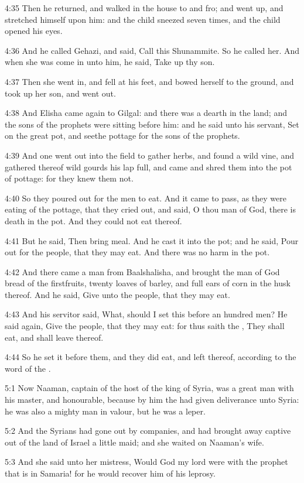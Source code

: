 4:35 Then he returned, and walked in the house to and fro; and went up, and stretched himself upon him: and the child sneezed seven times, and the child opened his eyes.

4:36 And he called Gehazi, and said, Call this Shunammite. So he called her. And when she was come in unto him, he said, Take up thy son.

4:37 Then she went in, and fell at his feet, and bowed herself to the ground, and took up her son, and went out.

4:38 And Elisha came again to Gilgal: and there was a dearth in the land; and the sons of the prophets were sitting before him: and he said unto his servant, Set on the great pot, and seethe pottage for the sons of the prophets.

4:39 And one went out into the field to gather herbs, and found a wild vine, and gathered thereof wild gourds his lap full, and came and shred them into the pot of pottage: for they knew them not.

4:40 So they poured out for the men to eat. And it came to pass, as they were eating of the pottage, that they cried out, and said, O thou man of God, there is death in the pot. And they could not eat thereof.

4:41 But he said, Then bring meal. And he cast it into the pot; and he said, Pour out for the people, that they may eat. And there was no harm in the pot.

4:42 And there came a man from Baalshalisha, and brought the man of God bread of the firstfruits, twenty loaves of barley, and full ears of corn in the husk thereof. And he said, Give unto the people, that they may eat.

4:43 And his servitor said, What, should I set this before an hundred men?  He said again, Give the people, that they may eat: for thus saith the \LORD, They shall eat, and shall leave thereof.

4:44 So he set it before them, and they did eat, and left thereof, according to the word of the \LORD.

5:1 Now Naaman, captain of the host of the king of Syria, was a great man with his master, and honourable, because by him the \LORD had given deliverance unto Syria: he was also a mighty man in valour, but he was a leper.

5:2 And the Syrians had gone out by companies, and had brought away captive out of the land of Israel a little maid; and she waited on Naaman's wife.

5:3 And she said unto her mistress, Would God my lord were with the prophet that is in Samaria! for he would recover him of his leprosy.

